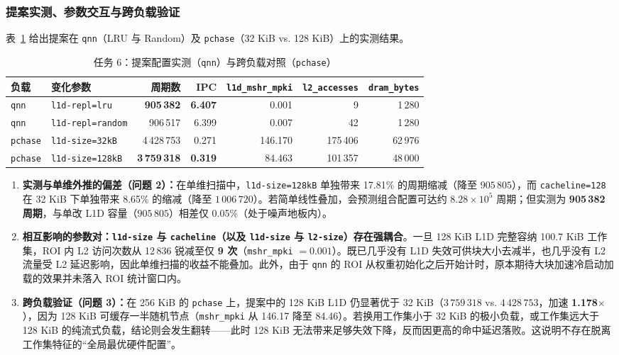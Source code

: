 \documentclass[12pt,a4paper,fontset=mac]{ctexart}
\begin{document}
\subsubsection{提案实测、参数交互与跨负载验证}
表~\ref{tab:task6} 给出提案在 \texttt{qnn}（LRU 与 Random）及 \texttt{pchase}（32 KiB vs. 128 KiB）上的实测结果。

\begin{table}[H]\centering\footnotesize\setlength{\tabcolsep}{4.5pt}
\caption{任务 6：提案配置实测（\texttt{qnn}）与跨负载对照（\texttt{pchase}）}\label{tab:task6}
\begin{tabular}{llrrrrr}\toprule
负载 & 变化参数 & 周期数 & IPC & \texttt{l1d\_mshr\_mpki} & \texttt{l2\_accesses} & \texttt{dram\_bytes} \\\midrule
\texttt{qnn} & \texttt{l1d-repl=lru}    & \textbf{905\,382} & \textbf{6.407} & 0.001 & 9 & 1\,280 \\
\texttt{qnn} & \texttt{l1d-repl=random} & 906\,517 & 6.399 & 0.007 & 42 & 1\,280 \\
\midrule
\texttt{pchase} & \texttt{l1d-size=32kB}  & 4\,428\,753 & 0.271 & 146.170 & 175\,406 & 62\,976 \\
\texttt{pchase} & \texttt{l1d-size=128kB} & \textbf{3\,759\,318} & \textbf{0.319} & 84.463  & 101\,357 & 48\,000 \\
\bottomrule\end{tabular}
\end{table}

\begin{enumerate}
  \item \textbf{实测与单维外推的偏差（问题 2）：}在单维扫描中，\texttt{l1d-size=128kB} 单独带来 17.81\% 的周期缩减（降至 $905\,805$），而 \texttt{cacheline=128} 在 32 KiB 下单独带来 8.65\% 的缩减（降至 $1\,006\,720$）。若简单线性叠加，会预测组合配置可达约 $8.28\times10^5$ 周期；但实测为 \textbf{905\,382 周期}，与单改 L1D 容量（$905\,805$）相差仅 0.05\%（处于噪声地板内）。
  \item \textbf{相互影响的参数对：}\textbf{\texttt{l1d-size} 与 \texttt{cacheline}（以及 \texttt{l1d-size} 与 \texttt{l2-size}）存在强耦合}。一旦 128 KiB L1D 完整容纳 100.7 KiB 工作集，ROI 内 L2 访问次数从 12\,836 锐减至仅 \textbf{9 次}（\texttt{mshr\_mpki} $=0.001$）。既已几乎没有 L1D 失效可供块大小去减半，也几乎没有 L2 流量受 L2 延迟影响，因此单维扫描的收益不能叠加。此外，由于 \texttt{qnn} 的 ROI 从权重初始化之后开始计时，原本期待大块加速冷启动加载的效果并未落入 ROI 统计窗口内。
  \item \textbf{跨负载验证（问题 3）：}在 256 KiB 的 \texttt{pchase} 上，提案中的 128 KiB L1D 仍显著优于 32 KiB（$3\,759\,318$ vs. $4\,428\,753$，加速 \textbf{1.178$\times$}），因为 128 KiB 可缓存一半随机节点（\texttt{mshr\_mpki} 从 146.17 降至 84.46）。若换用工作集小于 32 KiB 的极小负载，或工作集远大于 128 KiB 的纯流式负载，结论则会发生翻转——此时 128 KiB 无法带来足够失效下降，反而因更高的命中延迟落败。这说明不存在脱离工作集特征的“全局最优硬件配置”。
\end{enumerate}
\end{document}
